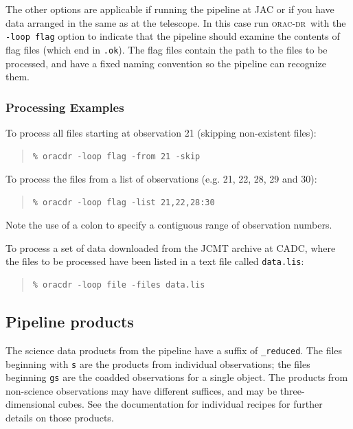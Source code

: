 \documentclass[twoside,11pt]{article}
\renewcommand{\_}{\texttt{\symbol{95}}}
\newenvironment{myquote}{\begin{quote}\begin{small}}{\end{small}\end{quote}}
\newcommand{\oracdr}{\textsc{orac-dr}}
\begin{document}
The other options are applicable if running the pipeline at JAC or if
you have data arranged in the same as at the telescope. In this case
run \oracdr\ with the \texttt{-loop flag} option to indicate that the pipeline
should examine the contents of flag files (which end in \verb+.ok+). The flag
files contain the path to the files to be processed, and have a fixed
naming convention so the pipeline can recognize them.

\subsubsection{Processing Examples}

To process all files starting at observation 21 (skipping non-existent
files):

\begin{myquote}
\begin{verbatim}
% oracdr -loop flag -from 21 -skip
\end{verbatim}
\end{myquote}

To process the files from a list of observations (e.g. 21, 22, 28, 29 and
30):

\begin{myquote}
\begin{verbatim}
% oracdr -loop flag -list 21,22,28:30
\end{verbatim}
\end{myquote}

Note the use of a colon to specify a contiguous range of observation
numbers.

To process a set of data downloaded from the JCMT archive at CADC,
where the files to be processed have been listed in a text file called
\verb+data.lis+:

\begin{myquote}
\begin{verbatim}
% oracdr -loop file -files data.lis
\end{verbatim}
\end{myquote}

\subsection{Pipeline products}

The science data products from the pipeline have a suffix of
\verb+_reduced+. The files beginning with \verb+s+ are the products from
individual observations; the files beginning \verb+gs+ are the coadded
observations for a single object. The products from non-science
observations may have different suffices, and may be three-dimensional
cubes. See the documentation for individual recipes for further
details on those products.
\end{document}
